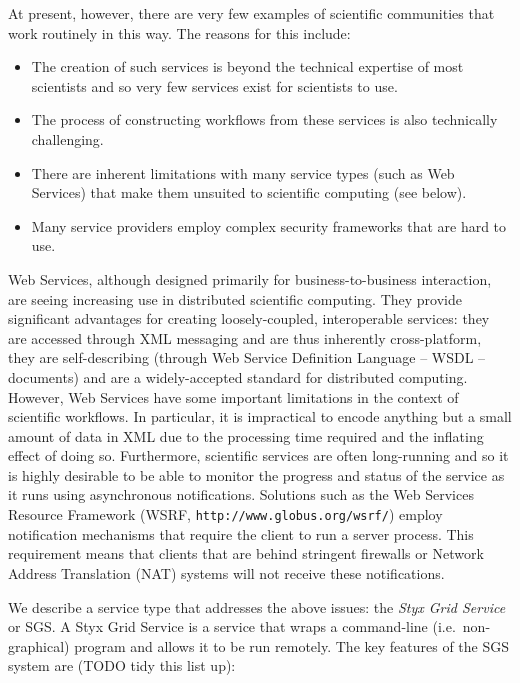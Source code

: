 \documentclass[a4paper]{article}
\begin{document}
At present, however, there are very few examples of scientific communities that work routinely in this way.  The reasons for this include:

\begin{itemize}
\item The creation of such services is beyond the technical expertise of most scientists and so very few services exist for scientists to use.
\item The process of constructing workflows from these services is also technically challenging.
\item There are inherent limitations with many service types (such as Web Services) that make them unsuited to scientific computing (see below).
\item Many service providers employ complex security frameworks that are hard to use.
\end{itemize}

Web Services, although designed primarily for business-to-business interaction, are seeing increasing use in distributed scientific computing.  They provide significant advantages for creating loosely-coupled, interoperable services: they are accessed through XML messaging and are thus inherently cross-platform, they are self-describing (through Web Service Definition Language -- WSDL -- documents) and are a widely-accepted standard for distributed computing.  However, Web Services have some important limitations in the context of scientific workflows. In particular, it is impractical to encode anything but a small amount of data in XML due to the processing time required and the inflating effect of doing so.  Furthermore, scientific services are often long-running and so it is highly desirable to be able to monitor the progress and status of the service as it runs using asynchronous notifications.  Solutions such as the Web Services Resource Framework (WSRF, \texttt{http://www.globus.org/wsrf/}) employ notification mechanisms that require the client to run a server process.  This requirement means that clients that are behind stringent firewalls or Network Address Translation (NAT) systems will not receive these notifications.

We describe a service type that addresses the above issues: the \textit{Styx Grid Service} or SGS.  A Styx Grid Service is a service that wraps a command-line (i.e.\ non-graphical) program and allows it to be run remotely.  The key features of the SGS system are (TODO tidy this list up):
\end{document}
